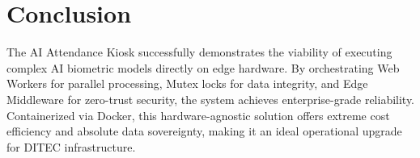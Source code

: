 \documentclass[12pt,a4paper]{report}
\begin{document}
\chapter{Conclusion}
\onehalfspacing
The AI Attendance Kiosk successfully demonstrates the viability of executing complex AI biometric models directly on edge hardware. By orchestrating Web Workers for parallel processing, Mutex locks for data integrity, and Edge Middleware for zero-trust security, the system achieves enterprise-grade reliability. Containerized via Docker, this hardware-agnostic solution offers extreme cost efficiency and absolute data sovereignty, making it an ideal operational upgrade for DITEC infrastructure.
\end{document}
